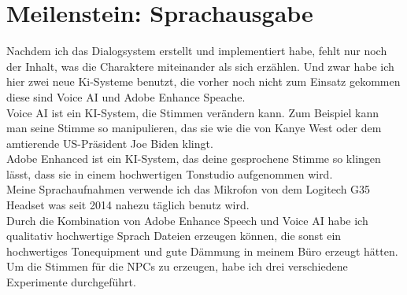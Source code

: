 {%
\section {Meilenstein: Sprachausgabe}
Nachdem ich das Dialogsystem erstellt und implementiert habe, fehlt nur noch der Inhalt, was die Charaktere miteinander als sich erzählen. Und zwar habe ich hier zwei neue Ki-Systeme benutzt, die vorher noch nicht zum Einsatz gekommen diese sind Voice AI und Adobe Enhance Speache.
\\
Voice AI ist ein KI-System, die Stimmen verändern kann. Zum Beispiel kann man seine Stimme so manipulieren, das sie wie die von Kanye West oder dem amtierende US-Präsident Joe Biden klingt.
\\
Adobe Enhanced ist ein KI-System, das deine gesprochene Stimme so klingen lässt, dass sie in einem hochwertigen Tonstudio aufgenommen wird.
\\
Meine Sprachaufnahmen verwende ich das Mikrofon von dem Logitech G35 Headset was seit 2014 nahezu täglich benutz wird.
\\
Durch die Kombination von Adobe Enhance Speech und Voice AI habe ich qualitativ hochwertige Sprach Dateien erzeugen können, die sonst ein hochwertiges Tonequipment und gute Dämmung in meinem Büro erzeugt hätten.
\\
Um die Stimmen für die NPCs zu erzeugen, habe ich drei verschiedene Experimente durchgeführt.
\\
}
